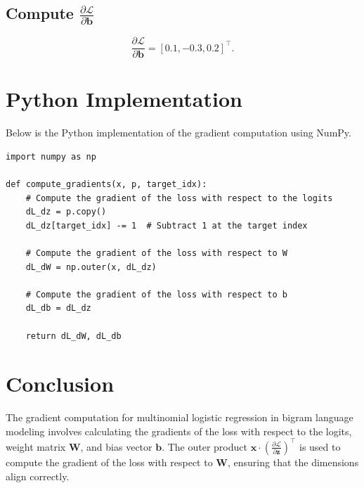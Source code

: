 \begin{notechapter}
\subsection{Compute \(\frac{\partial \mathcal{L}}{\partial \mathbf{b}}\)}
\[
\frac{\partial \mathcal{L}}{\partial \mathbf{b}} = 
[0.1, -0.3, 0.2]^\top.
\]

\section{Python Implementation}
Below is the Python implementation of the gradient computation using NumPy.

\begin{verbatim}
import numpy as np

def compute_gradients(x, p, target_idx):
    # Compute the gradient of the loss with respect to the logits
    dL_dz = p.copy()
    dL_dz[target_idx] -= 1  # Subtract 1 at the target index

    # Compute the gradient of the loss with respect to W
    dL_dW = np.outer(x, dL_dz)

    # Compute the gradient of the loss with respect to b
    dL_db = dL_dz

    return dL_dW, dL_db
\end{verbatim}

\section{Conclusion}
The gradient computation for multinomial logistic regression in bigram language
modeling involves calculating the gradients of the loss with respect to the
logits, weight matrix \(\mathbf{W}\), and bias vector \(\mathbf{b}\). The
outer product \(\mathbf{x} \cdot \left( \frac{\partial \mathcal{L}}{\partial \mathbf{z}} \right)^\top\)
is used to compute the gradient of the loss with respect to \(\mathbf{W}\),
ensuring that the dimensions align correctly.
\end{notechapter}
